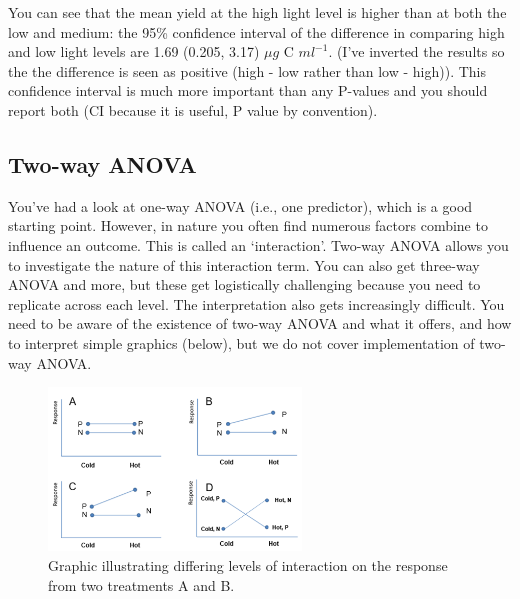 \documentclass[
  11pt,
  a4paper,
]{book}
\begin{document}
You can see that the mean yield at the high light level is higher than at both the low and medium: the 95\% confidence interval of the difference in comparing high and low light levels are 1.69 (0.205, 3.17) \(\mu g\) C \(ml^{-1}\). (I've inverted the results so the the difference is seen as positive (high - low rather than low - high)). This confidence interval is much more important than any P-values and you should report both (CI because it is useful, P value by convention).

\hypertarget{two-way-anova}{%
\subsection{Two-way ANOVA}\label{two-way-anova}}

You've had a look at one-way ANOVA (i.e., one predictor), which is a good starting point. However, in nature you often find numerous factors combine to influence an outcome. This is called an `interaction'. Two-way ANOVA allows you to investigate the nature of this interaction term. You can also get three-way ANOVA and more, but these get logistically challenging because you need to replicate across each level. The interpretation also gets increasingly difficult. You need to be aware of the existence of two-way ANOVA and what it offers, and how to interpret simple graphics (below), but we do not cover implementation of two-way ANOVA.

\begin{figure}
\centerline{\includegraphics[width=0.6\textwidth]{figs/interactions.png}}
\caption{Graphic illustrating differing levels of interaction on the response from two treatments A and B.}
\label{fig:interaction}
\end{figure}
\end{document}
